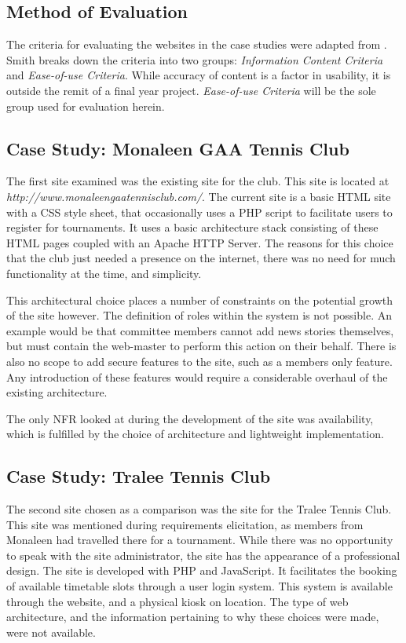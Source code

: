 \subsection{Method of Evaluation}

The criteria for evaluating the websites in the case studies were adapted from \cite{smith2001applying}. Smith breaks down the criteria into two groups: \textit{Information Content Criteria} and \textit{Ease-of-use Criteria}. While accuracy of content is a factor in usability, it is outside the remit of a final year project. \textit{Ease-of-use Criteria} will be the sole group used for evaluation herein. 


\subsection{Case Study: Monaleen GAA Tennis Club}

The first site examined was the existing site for the club. This site is located at \newline\textit{http://www.monaleengaatennisclub.com/}. The current site is a basic HTML site with a CSS style sheet, that occasionally uses a PHP script to facilitate users to register for tournaments. It uses a basic architecture stack consisting of these HTML pages coupled with an Apache HTTP Server. The reasons for this choice that the club just needed a presence on the internet, there was no need for much functionality at the time, and simplicity.

This architectural choice places a number of constraints on the potential growth of the site however. The definition of roles within the system is not possible. An example would be that committee members cannot add news stories themselves, but must contain the web-master to perform this action on their behalf. There is also no scope to add secure features to the site, such as a members only feature. Any introduction of these features would require a considerable overhaul of the existing architecture.

The only NFR looked at during the development of the site was availability, which is fulfilled by the choice of architecture and lightweight implementation. 

\subsection{Case Study: Tralee Tennis Club}

The second site chosen as a comparison was the site for the Tralee Tennis Club. This site was mentioned during requirements elicitation, as members from Monaleen had travelled there for a tournament. While there was no opportunity to speak with the site administrator, the site has the appearance of a professional design. The site is developed with PHP and JavaScript. It facilitates the booking of available timetable slots through a user login system. This system is available through the website, and a physical kiosk on location. The type of web architecture, and the information pertaining to why these choices were made, were not available.  

